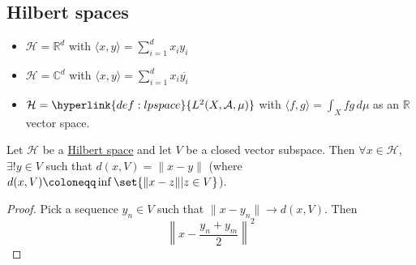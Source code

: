 \documentclass{article}
\newcommand{\1}[1]{\mathbbm{1}_{#1}}
\begin{document}
\subsection{Hilbert spaces}

\begin{eg}
    \begin{itemize}
        \item $\mathcal{H}=\mathbb{R}^d$ with $\langle x,y\rangle = \sum_{i=1}^d x_i y_i$
        \item $\mathcal{H}=\mathbb{C}^d$ with $\langle x,y\rangle = \sum_{i=1}^d x_i \overline{y_i}$
        \item $\mathcal{H}=\hyperlink{def:lpspace}{L^2(X,\mathcal{A},\mu)}$ with $\langle f,g\rangle = \int_X fg \, d\mu$ as an $\mathbb{R}$ vector space.
    \end{itemize}
\end{eg}
\begin{lemma}
    Let $\mathcal{H}$ be a \hyperlink{def:hilbert}{Hilbert space} and let $V$ be a closed vector subspace.
    Then $\forall x \in \mathcal{H}$, $\exists! y \in V$ such that $d(x,V) = \|x-y\|$ (where $d(x,V) \coloneqq \inf\set{\|x-z\| | z \in V}$).
\end{lemma}
\begin{proof}
    Pick a sequence $y_n \in V$ such that $\|x-y_n\| \to d(x,V)$. Then
    \begin{equation*}
        \left\|x-\frac{y_n+y_m}{2}\right\|^2
    \end{equation*}
\end{proof}
\end{document}
